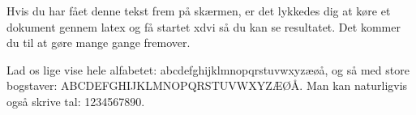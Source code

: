 \documentclass[12pt,a4paper]{article}
\begin{document}
Hvis du har fået denne tekst frem på skærmen, er det lykkedes dig at
køre et dokument gennem latex og få startet xdvi så du kan se
resultatet. Det kommer du til at gøre mange gange fremover.

Lad os lige vise hele alfabetet: abcdefghijklmnopqrstuvwxyzæøå, og så
med store bogstaver: ABCDEFGHIJKLMNOPQRSTUVWXYZÆØÅ. Man kan
naturligvis også skrive tal: 1234567890.
\end{document}

